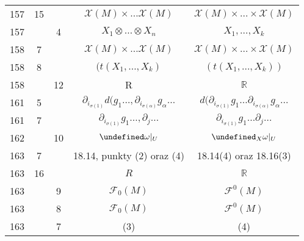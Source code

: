 \documentclass[a4paper,11pt]{article}
\newcommand{\mb}{\mathbb}
\newcommand{\mc}{\mathcal}
\newcommand{\pr}{\partial}
\newcommand{\ld}{\ldots}
\newcommand{\ti}{\times}
\newcommand{\ot}{\otimes}
\newcommand{\al}{\alpha}
\newcommand{\om}{\omega}
\newcommand{\s}{\sigma}
\newcommand{\R}{\mb{R}}
\newcommand{\F}{\mc{F}}
\let\L\undefined
\newcommand{\L}{\mc{L}}
\newcommand{\X}{\mc{X}}
\begin{document}
\begin{center}
\begin{tabular}{|c|c|c|c|c|}
    157 & 15 & & $\X( M ) \ti \ld \X( M )$ & $\X( M ) \ti \ld \ti
                                             \X( M )$ \\
    157 & &  4 & $X_{ 1 } \ot \ld \ot X_{ n }$ & $X_{ 1 }, \ld, X_{ k }$ \\
    158 &  7 & & $\X( M ) \ti \ld \X( M )$
           & $\X( M ) \ti \ld \ti \X( M )$ \\
    158 &  8 & & $( t( X_{ 1 }, \ld, X_{ k } )$
           & $( t( X_{ 1 }, \ld, X_{ k } ) )$ \\
    158 & & 12 & R & $\R$ \\
    161 &  5 & & $\pr_{ i_{ \s( 1 ) } } d( g_{ 1 } \ld,
                 \pr_{ i_{ \s( \al ) } } g_{ \al } \ld$
           & $d( \pr_{ i_{ \s( 1 ) } } g_{ 1 } \ld
             \pr_{ i_{ \s( \al ) } } g_{ \al } \ld$ \\
    161 &  7 & & $\pr_{ i_{ \s( 1 ) } } g_{ 1 } \ld, \pr_{ j }\ld$
           & $\pr_{ i_{ \s( 1 ) } } g_{ 1 } \ld \pr_{ j }\ld$ \\
    162 & & 10 & $\L\om |_{ U }$ & $\L_{ X }\om|_{ U } $ \\
    163 &  7 & & 18.14, punkty (2) oraz (4) & 18.14(4) oraz 18.16(3) \\
    163 & 16 & & $R$ & $\R$ \\
    163 & &  9 & $\F_{ 0 }( M )$ & $\F^{ 0 }( M )$ \\
    163 & &  8 & $\F_{ 0 }( M )$ & $\F^{ 0 }( M )$ \\
    163 & &  7 & (3) & (4) \\
    \hline
  \end{tabular}



\end{center}
\end{document}
